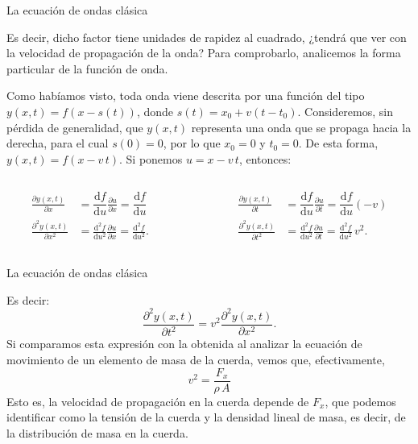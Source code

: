 \documentclass[11pt,handout,aspectratio=1610]{beamer}
\newcommand{\diff}[0]{\text{d}}
\newcommand{\fdiff}[2]{\dfrac{\text{d} #1}{\text{d} #2}}
\newcommand{\pdiff}[2]{\frac{\partial #1}{\partial #2}}
\newcommand{\pddiff}[2]{\frac{\partial^2 #1}{\partial #2^2}}
\newcommand{\fddiff}[2]{\frac{\diff^2 #1}{\diff #2^2}}
\newcommand{\vs}{\vspace{11pt}}
\begin{document}
\begin{frame}{La ecuación de ondas clásica}

    Es decir, dicho factor tiene unidades de rapidez al cuadrado, ¿tendrá que ver con la velocidad de propagación de la onda? Para comprobarlo, analicemos la forma particular de la función de onda.

    \vs 

    Como habíamos visto, toda onda viene descrita por una función del tipo $y(x,t) = f(x-s(t))$, donde $s(t) = x_0 + v \left(t-t_0\right)$. Consideremos, sin pérdida de generalidad, que $y(x,t)$ representa una onda que se propaga hacia la derecha, para el cual $s(0) = 0$, por lo que $x_0 = 0$ y $t_0 = 0$. De esta forma, $y(x,t) = f(x-v \, t)$. Si ponemos $u = x-v \, t$, entonces:
    \begin{columns}
        \begin{column}{0.45\textwidth}
            \begin{align*}
                \pdiff{y(x,t)}{x} &= \fdiff{f}{u} \pdiff{u}{x} = \fdiff{f}{u} \\
                \pddiff{y(x,t)}{x} &= \fddiff{f}{u} \pdiff{u}{x} = \fddiff{f}{u}.
            \end{align*}
        \end{column}
        ~
        \begin{column}{0.45\textwidth}
            \begin{align*}
                \pdiff{y(x,t)}{t} &= \fdiff{f}{u} \pdiff{u}{t} = \fdiff{f}{u} \left(-v\right) \\
                \pddiff{y(x,t)}{t} &= \fddiff{f}{u} \pdiff{u}{t} = \fddiff{f}{u} \, v^2.
            \end{align*}        
        \end{column}
    \end{columns}

\end{frame}

\begin{frame}{La ecuación de ondas clásica}
    
    Es decir: $$ \pddiff{y (x,t)}{t} = v^2 \pddiff{y (x,t)}{x}. $$ Si comparamos esta expresión con la obtenida al analizar la ecuación de movimiento de un elemento de masa de la cuerda, vemos que, efectivamente, $$ v^2 = \frac{F_x}{\rho \, A} $$ Esto es, la velocidad de propagación en la cuerda depende de $F_x$, que podemos identificar como la tensión de la cuerda y la densidad lineal de masa, es decir, de la distribución de masa en la cuerda.
   
\end{frame}
\end{document}
